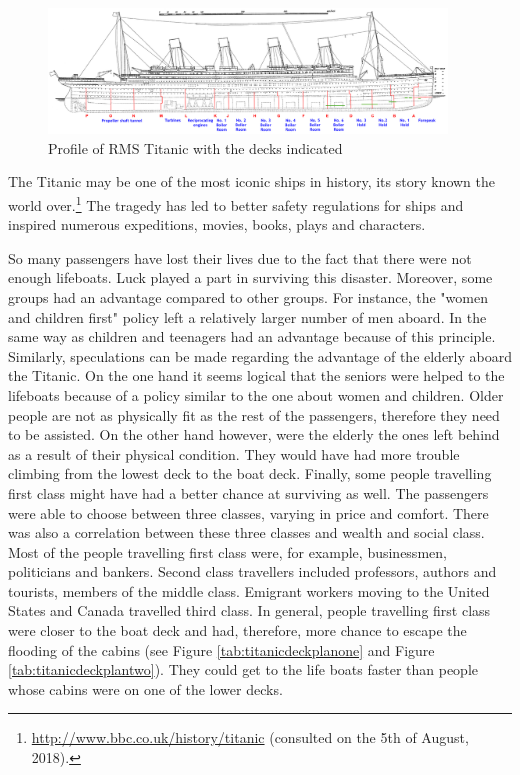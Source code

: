 \documentclass[11pt]{article}
\begin{document}
\begin{figure}[htbp]
\centering
\includegraphics[width=400px]{./TitanicProfile.png}
\caption{\label{tab:titanicprofile}
Profile of RMS Titanic with the decks indicated}
\end{figure} 

The Titanic may be one of the most iconic ships in history, its story known the world over.\footnote{\url{http://www.bbc.co.uk/history/titanic} (consulted on the 5th of August, 2018).} The tragedy has led to better safety regulations for ships and inspired numerous expeditions, movies, books, plays and characters.

So many passengers have lost their lives due to the fact that there were not enough lifeboats. Luck played a part in surviving this disaster. Moreover, some groups had an advantage compared to other groups. For instance, the "women and children first" policy left a relatively larger number of men aboard. In the same way as children and teenagers had an advantage because of this principle. Similarly, speculations can be made regarding the advantage of the elderly aboard the Titanic. On the one hand it seems logical that the seniors were helped to the lifeboats because of a policy similar to the one about women and children. Older people are not as physically fit as the rest of the passengers, therefore they need to be assisted. On the other hand however, were the elderly the ones left behind as a result of their physical condition. They would have had more trouble climbing from the lowest deck to the boat deck. Finally, some people travelling first class might have had a better chance at surviving as well. The passengers were able to choose between three classes, varying in price and comfort. There was also a correlation between these three classes and wealth and social class. Most of the people travelling first class were, for example, businessmen, politicians and bankers. Second class travellers included professors, authors and tourists, members of the middle class. Emigrant workers moving to the United States and Canada travelled third class. In general, people travelling first class were closer to the boat deck and had, therefore, more chance to escape the flooding of the cabins (see Figure \ref{tab:titanicdeckplanone} and Figure \ref{tab:titanicdeckplantwo}). They could get to the life boats faster than people whose cabins were on one of the lower decks.
\end{document}
